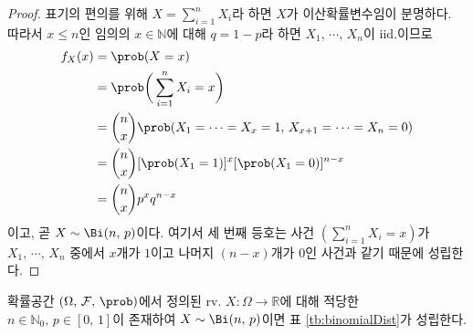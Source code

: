 \begin{proof}
    표기의 편의를 위해 $X=\sum_{i=1}^nX_i$라 하면 $X$가 이산확률변수임이 분명하다. 따라서 $x\leq n$인 임의의 $x\in\mathbb{N}$에 대해 $q=1-p$라 하면 $X_1,\,\cdots,\,X_n$이 iid.이므로
    \begin{align*}
        f_X(x)&=\prob(X=x)\\
        &=\prob\bigg(\sum_{i=1}^nX_i=x\bigg)\\
        &=\binom{n}{x}\prob(X_1=\cdots=X_x=1,\,X_{x+1}=\cdots=X_n=0)\\
        &=\binom{n}{x}[\prob(X_1=1)]^x[\prob(X_1=0)]^{n-x}\\
        &=\binom{n}{x}p^xq^{n-x}
    \end{align*}
    이고, 곧 $X\sim\Bi(n,\,p)$이다. 여기서 세 번째 등호는 사건 $(\sum_{i=1}^nX_i=x)$가 $X_1,\,\cdots,\,X_n$ 중에서 $x$개가 $1$이고 나머지 $(n-x)$개가 $0$인 사건과 같기 때문에 성립한다.
\end{proof}

\begin{theorem}
    확률공간 $(\Omega,\,\mathcal{F},\,\prob)$에서 정의된 rv. $X:\Omega\to\mathbb{R}$에 대해 적당한 $n\in\mathbb{N}_0,\,p\in[0,\,1]$이 존재하여 $X\sim\Bi(n,\,p)$이면 표 \ref{tb:binomialDist}가 성립한다.
\end{theorem}

